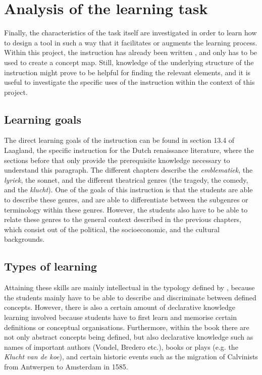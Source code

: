 \section{Analysis of the learning task}
\label{sec:taskanalysis}

Finally, the characteristics of the task itself are investigated in order to learn how to design a tool in such a way that it facilitates or augments the learning process. Within this project, the instruction has already been written \cite{laagland}, and only has to be used to create a concept map. Still, knowledge of the underlying structure of the instruction might prove to be helpful for finding the relevant elements, and it is useful to investigate the specific uses of the instruction within the context of this project.

\subsection{Learning goals}

The direct learning goals of the instruction can be found in section 13.4 of Laagland, the specific instruction for the Dutch renaissance literature, where the sections before that only provide the prerequisite knowledge necessary to understand this paragraph. The different chapters describe the \emph{emblematiek}, the \emph{lyriek}, the sonnet, and the different theatrical genres (the tragedy, the comedy, and the \emph{klucht}). One of the goals of this instruction is that the students are able to describe these genres, and are able to differentiate between the subgenres or terminology within these genres. However, the students also have to be able to relate these genres to the general context described in the previous chapters, which consist out of the political, the socioeconomic, and the cultural backgrounds.

\subsection{Types of learning}

Attaining these skills are mainly intellectual in the typology defined by , because the students mainly have to be able to describe and discriminate between defined concepts. However, there is also a certain amount of declarative knowledge learning involved because students have to first learn and memorise certain definitions or conceptual organisations. Furthermore, within the book there are not only abstract concepts being defined, but also declarative knowledge such as names of important authors (Vondel, Bredero etc.), books or plays (e.g. the \emph{Klucht van de koe}), and certain historic events such as the migration of Calvinists from Antwerpen to Amsterdam in 1585.

